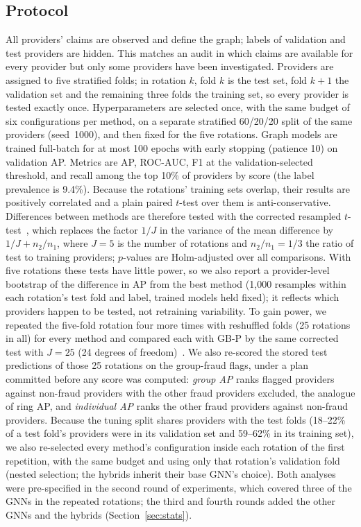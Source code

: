 \documentclass[pdflatex,sn-vancouver-num]{sn-jnl}
\begin{document}
\subsection{Protocol}
All providers' claims are observed and define the graph; labels of
validation and test providers are hidden. This matches an audit in which
claims are available for every provider but only some providers have been
investigated. Providers are assigned to five stratified folds; in rotation
$k$, fold $k$ is the test set, fold $k+1$ the validation set and the
remaining three folds the training set, so every provider is tested exactly
once. Hyperparameters are selected once, with the same budget of six
configurations per method, on a separate stratified 60/20/20 split of the same
providers (seed~1000), and then fixed for the five rotations. Graph models are
trained full-batch for at most 100 epochs with early stopping (patience 10)
on validation AP. Metrics are AP, ROC-AUC, F1 at the validation-selected
threshold, and recall among the top 10\% of providers by score (the label
prevalence is 9.4\%). Because the rotations' training sets overlap, their
results are positively correlated and a plain paired $t$-test over them is
anti-conservative. Differences between methods are therefore tested with the
corrected resampled $t$-test~\cite{nadeau2003}, which replaces the factor
$1/J$ in the variance of the mean difference by $1/J + n_2/n_1$, where $J=5$
is the number of rotations and $n_2/n_1 = 1/3$ the ratio of test to training
providers; $p$-values are Holm-adjusted over all comparisons. With five
rotations these tests have little power, so we also report a provider-level
bootstrap of the difference in AP from the best method (1{,}000 resamples
within each rotation's test fold and label, trained models held fixed); it
reflects which providers happen to be tested, not retraining variability.
To gain power, we repeated the five-fold rotation four more times with
reshuffled folds (25 rotations in all) for every method and compared each
with GB-P by the same corrected test with $J=25$ (24 degrees of
freedom)~\cite{nadeau2003,bouckaert2004}. We also re-scored the stored test
predictions of those 25 rotations on the group-fraud flags, under a plan
committed before any score was computed: \emph{group AP} ranks flagged
providers against non-fraud providers with the other fraud providers excluded,
the analogue of ring AP, and \emph{individual AP} ranks the other fraud
providers against non-fraud providers.
Because the tuning split shares providers with the test folds (18--22\% of a
test fold's providers were in its validation set and 59--62\% in its training
set), we also re-selected every method's configuration inside each rotation of the first
repetition, with the same budget and using only that rotation's validation
fold (nested selection; the hybrids inherit their base GNN's choice). Both
analyses were pre-specified in the second round of experiments, which
covered three of the GNNs in the repeated rotations; the third and fourth
rounds added the other GNNs and the hybrids (Section~\ref{sec:stats}).
\end{document}
